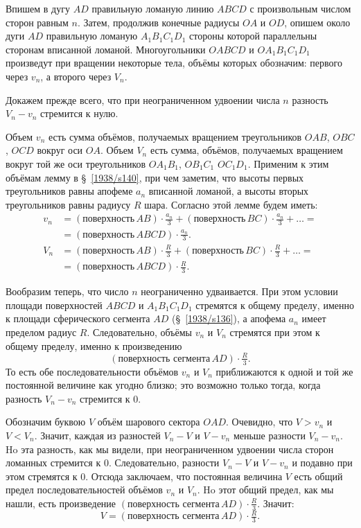 Впишем в дугу $AD$ правильную ломаную линию $ABCD$ с произвольным числом сторон равным $n$.
Затем, продолжив конечные радиусы $OA$ и $OD$, опишем около дуги $AD$ правильную ломаную $A_1B_1C_1D_1$ стороны которой параллельны сторонам вписанной ломаной.
Многоугольники $OABCD$ и $OA_1B_1C_1D_1$ произведут при вращении некоторые тела, объёмы которых обозначим: первого через $v_n$, а второго через $V_n$.

Докажем прежде всего, что при неограниченном удвоении числа $n$ разность $V_n-v_n$ стремится к нулю.

Объем $v_n$ есть сумма объёмов, получаемых вращением треугольников $OAB$, $OBC$, $OCD$ вокруг оси $OA$.
Объем $V_n$ есть сумма, объёмов, получаемых вращением вокруг той же оси треугольников $OA_1B_1$, $OB_1C_1$ $OC_1D_1$.
Применим к этим объёмам лемму в §~\ref{1938/s140}, при чем заметим, что высоты первых треугольников равны апофеме $a_n$ вписанной ломаной, а высоты вторых треугольников равны радиусу $R$ шара.
Согласно этой лемме будем иметь:
\begin{align*}
v_n&=
(\text{поверхность}\, AB)\cdot\tfrac {a_n}3
+
(\text{поверхность}\, BC)\cdot\tfrac {a_n}3
+
\dots=
\\
&=
(\text{поверхность}\, ABCD)\cdot \tfrac {a_n}3.
\\
V_n&=
(\text{поверхность}\, AB)\cdot\tfrac R3
+
(\text{поверхность}\, BC)\cdot\tfrac R3
+
\dots=
\\
&=
(\text{поверхность}\, ABCD)\cdot \tfrac R3.
\end{align*}


Вообразим теперь, что число $n$ неограниченно удваивается.
При этом условии площади поверхностей $ABCD$ и $A_1B_1C_1D_1$ стремятся к общему пределу, именно к площади сферического сегмента $AD$ (§~\ref{1938/s136}), а апофема $a_n$ имеет пределом радиус $R$.
Следовательно, объёмы $v_n$ и $V_n$ стремятся при этом к общему пределу, именно к произведению 
\[(\text{поверхность сегмента}\,  AD)\cdot \tfrac R3.\]
То есть обе последовательности объёмов $v_n$ и $V_n$ приближаются к одной и той же постоянной величине как угодно близко; это возможно только тогда, когда разность $V_n-v_n$ стремится к $0$.

Обозначим буквою $V$ объём шарового сектора $OAD$.
Очевидно, что $V>v_n$ и $V<V_n$.
Значит, каждая из разностей $V_n-V$ и $V-v_n$ меньше разности $V_n-v_n$.
Ho эта разность, как мы видели, при неограниченном удвоении числа сторон ломанных стремится к $0$. Следовательно, разности $V_n-V$ и $V-v_n$ и подавно при этом стремятся к $0$.
Отсюда заключаем, что постоянная величина $V$ есть общий предел последовательностей объёмов $v_n$ и $V_n$.
Ho этот общий предел, как мы нашли, есть произведение $(\text{поверхность сегмента}\,  AD)\cdot \tfrac R3$.
Значит:
\[V=(\text{поверхность сегмента}\,  AD)\cdot \tfrac R3.\]

